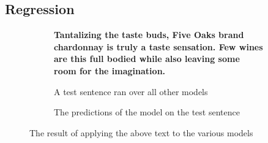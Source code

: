 \documentclass[12pt]{IEEEtran}
\begin{document}
\subsection{Regression}
\begin{figure}
    \centering
    \begin{subfigure}{\columnwidth}
        \centering
        \textbf{Tantalizing the taste buds, Five Oaks brand chardonnay is truly 
        a taste sensation. Few wines are this full bodied while also leaving some
        room for the imagination.}
        \caption{A test sentence ran over all other models}
    \end{subfigure}
    \begin{subfigure}{\columnwidth}
        \centering
        \caption{The predictions of the model on the test sentence}
    \end{subfigure}
    \caption{ The result of applying the above text to the various models}
    \label{regression_ex}
\end{figure}
\end{document}
